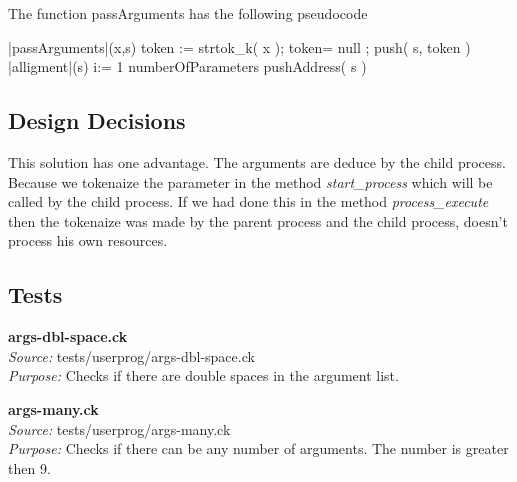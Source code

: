 {	  The function passArguments has the following pseudocode


    \begin{program}
    \BEGIN %
    \PROC |passArguments|(x,s) \BODY
              \DO
	      token := strtok_k( x );
	      \IF token= null \THEN \EXIT \FI;
                 \ELSE push( s, token )   
	      \OD
	      |alligment|(s)
              \FOR i:= 1 \TO numberOfParameters  \DO
		pushAddress( s ) \OD
     \ENDPROC
    \END
    \end{program}


    \subsection{Design Decisions}

	This solution has one advantage. The arguments are 
     deduce by the child process. Because we tokenaize the 
     parameter in the method \textit{start\_process} which 
     will be called by the child process. If we had done 
     this in the method \textit{process\_execute} then the 
     tokenaize was made by the parent process and the child
     process, doesn't process his own resources.

    \subsection{Tests}


      \textbf{args-dbl-space.ck}\\
      \textit{Source:} tests/userprog/args-dbl-space.ck\\
      \textit{Purpose:} Checks if there are double spaces 
	  in the argument list.


      \textbf{args-many.ck}\\
      \textit{Source:} tests/userprog/args-many.ck\\
      \textit{Purpose:} Checks if there can be any number of arguments. 
	  The number is greater then 9.

}
